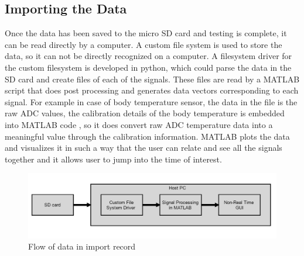 \subsection{Importing the Data}
Once the data has been saved to the micro SD card and testing is complete, it can be read directly by a computer. A custom file system is used to store the data, so it can not be directly recognized on a computer. A filesystem driver for the custom filesystem is developed in python, which could parse the data in the SD card and create files of each of the signals. These files are read by a MATLAB script that does post processing and generates data vectors corresponding to each signal. For example in case of body temperature sensor, the data in the file is the raw ADC values, the calibration details of the body temperature is embedded into MATLAB code , so it does convert raw ADC temperature  data into a meaningful value through the calibration information.  
MATLAB plots the data and visualizes it in such a way that the user can relate and see all the signals together and it allows user to jump into the time of interest. 
 \begin{figure}[h]
	\centering
	\includegraphics[scale = 0.5 ]{play_dataflow.JPG}
	\caption{Flow of data in import record\label{play_dataflow}}
\end{figure}